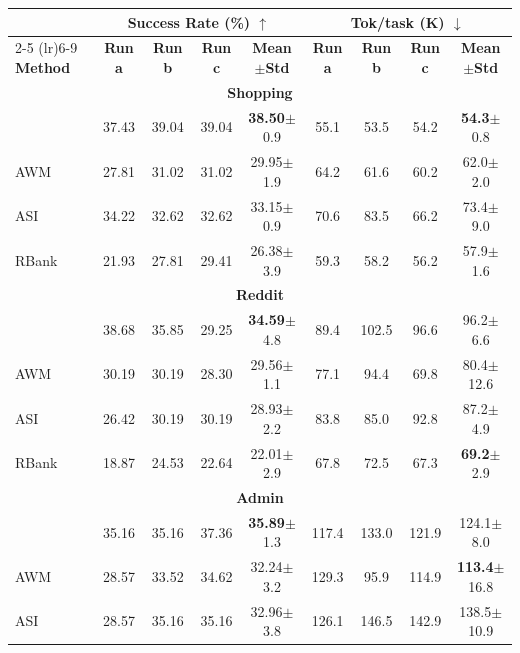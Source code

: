 \begin{table}[ht]
\centering
\small
\begin{tabular}{lcccccccc}
\toprule
& \multicolumn{4}{c}{\textbf{Success Rate (\%) $\uparrow$}} & \multicolumn{4}{c}{\textbf{Tok/task (K) $\downarrow$}} \\
\cmidrule(lr){2-5} \cmidrule(lr){6-9}
\textbf{Method} & \textbf{Run a} & \textbf{Run b} & \textbf{Run c} & \textbf{Mean$\pm$Std} & \textbf{Run a} & \textbf{Run b} & \textbf{Run c} & \textbf{Mean$\pm$Std} \\
\midrule
\multicolumn{9}{c}{\textbf{Shopping}} \\
\midrule
\budgetactor{}      & 37.43 & 39.04 & 39.04 & \textbf{38.50}{\scriptsize $\pm$0.9} & 55.1 & 53.5 & 54.2 & \textbf{54.3}{\scriptsize $\pm$0.8} \\
AWM            & 27.81 & 31.02 & 31.02 & 29.95{\scriptsize $\pm$1.9} & 64.2 & 61.6 & 60.2 & 62.0{\scriptsize $\pm$2.0} \\
ASI            & 34.22 & 32.62 & 32.62 & 33.15{\scriptsize $\pm$0.9} & 70.6 & 83.5 & 66.2 & 73.4{\scriptsize $\pm$9.0} \\
RBank          & 21.93 & 27.81 & 29.41 & 26.38{\scriptsize $\pm$3.9} & 59.3 & 58.2 & 56.2 & 57.9{\scriptsize $\pm$1.6} \\
\midrule
\multicolumn{9}{c}{\textbf{Reddit}} \\
\midrule
\budgetactor{}      & 38.68 & 35.85 & 29.25 & \textbf{34.59}{\scriptsize $\pm$4.8} & 89.4 & 102.5 & 96.6 & 96.2{\scriptsize $\pm$6.6} \\
AWM            & 30.19 & 30.19 & 28.30 & 29.56{\scriptsize $\pm$1.1} & 77.1 & 94.4 & 69.8 & 80.4{\scriptsize $\pm$12.6} \\
ASI            & 26.42 & 30.19 & 30.19 & 28.93{\scriptsize $\pm$2.2} & 83.8 & 85.0 & 92.8 & 87.2{\scriptsize $\pm$4.9} \\
RBank          & 18.87 & 24.53 & 22.64 & 22.01{\scriptsize $\pm$2.9} & 67.8 & 72.5 & 67.3 & \textbf{69.2}{\scriptsize $\pm$2.9} \\
\midrule
\multicolumn{9}{c}{\textbf{Admin}} \\
\midrule
\budgetactor{}      & 35.16 & 35.16 & 37.36 & \textbf{35.89}{\scriptsize $\pm$1.3} & 117.4 & 133.0 & 121.9 & 124.1{\scriptsize $\pm$8.0} \\
AWM            & 28.57 & 33.52 & 34.62 & 32.24{\scriptsize $\pm$3.2} & 129.3 &  95.9 & 114.9 & \textbf{113.4}{\scriptsize $\pm$16.8} \\
ASI            & 28.57 & 35.16 & 35.16 & 32.96{\scriptsize $\pm$3.8} & 126.1 & 146.5 & 142.9 & 138.5{\scriptsize $\pm$10.9} \\

\end{tabular}
\end{table}
